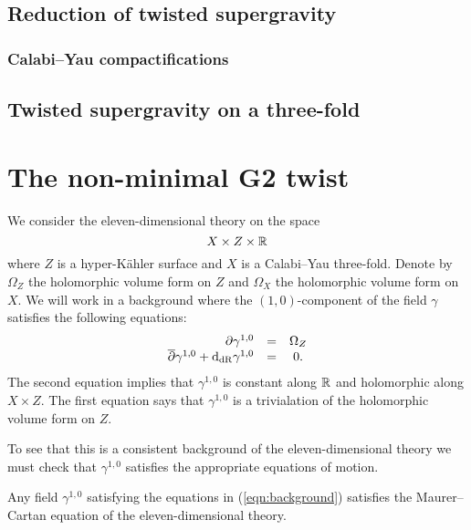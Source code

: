 \documentclass[11pt]{amsart}
\begin{document}
\subsection{Reduction of twisted supergravity}
\label{sec:orgcf7b6a4}
\subsubsection{Calabi--Yau compactifications}
\label{sec:org16a2c98}
\subsection{Twisted supergravity on a three-fold}
\label{sec:org774abb4}
\section{The non-minimal G2 twist}
\label{sec:org590ab85}


We consider the eleven-dimensional theory on the space
\[
  X \times Z \times \mathbb R
\]
where $Z$ is a hyper-K\"{a}hler surface and $X$ is a Calabi--Yau three-fold.
Denote by $\Omega_Z$ the holomorphic volume form on $Z$ and $\Omega_X$ the holomorphic volume form on $X$.
We will work in a background where the $(1,0)$-component of the field $\gamma$ satisfies the following equations:
\begin{equation}\label{eqn:background}
  \begin{array}{rcccc}
    \partial \gamma^{1,0} & = & \Omega_Z \\
    \overline{\partial} \gamma^{1,0} + {\rm d}_{\rm dR} \gamma^{1,0} & = & 0 .
  \end{array}
\end{equation}
The second equation implies that $\gamma^{1,0}$ is constant along $\mathbb R$ and holomorphic along $X \times Z$.
The first equation says that $\gamma^{1,0}$ is a trivialation of the holomorphic volume form on $Z$.

To see that this is a consistent background of the eleven-dimensional theory we must check that $\gamma^{1,0}$ satisfies the appropriate equations of motion.

\begin{lem}
  Any field $\gamma^{1,0}$ satisfying the equations in (\ref{eqn:background}) satisfies the Maurer--Cartan equation of the eleven-dimensional theory.
\end{lem}
\end{document}

